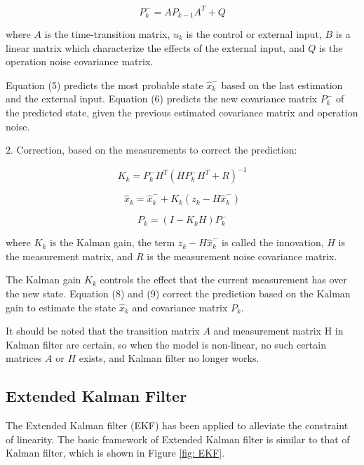 \documentclass[10pt,twocolumn,letterpaper]{article}
\begin{document}
\begin{equation}
P_k^-=AP_{k-1}A^T+Q
\end{equation}

where $A$ is the time-transition matrix,  $u_k$ is the control or external input, $B$ is a linear matrix which characterize the effects of the external input, and $Q$ is the operation noise covariance matrix.

Equation (5) predicts the most probable state $\hat{x}_k^-$ based on the last estimation and the external input. Equation (6) predicts the new covariance matrix $P_k^-$ of the predicted state, given the previous estimated covariance matrix and operation noise.

2. Correction, based on the measurements to correct the prediction:

\begin{equation}
K_k=P_k^-H^T(HP_k^-H^T+R)^{-1}
\end{equation}

\begin{equation}
\hat{x}_k=\hat{x}_k^-+K_k(z_k-H\hat{x}_k^-)
\end{equation}

\begin{equation}
P_k=(I-K_kH)P_k^-
\end{equation}

where $K_k$ is the Kalman gain, the term $z_k-H\hat{x}_k^-$ is called the innovation, $H$ is the measurement matrix, and $R$ is the measurement noise covariance matrix.

The Kalman gain $K_k$ controls the effect that the current measurement has over the new state. Equation (8) and (9) correct the prediction based on the Kalman gain to estimate the state $\hat{x}_k$ and covariance matrix $P_k$.

It should be noted that the transition matrix $A$ and measurement matrix H in Kalman filter are certain, so when the model is non-linear, no such certain matrices $A$ or $H$ exists, and Kalman filter no longer works.

\subsection{Extended Kalman Filter}

The Extended Kalman filter (EKF)\cite{ref:peter}\cite{ref:sorenson} has been applied to alleviate the constraint of linearity. The basic framework of Extended Kalman filter is similar to that of Kalman filter, which is shown in Figure \ref{fig: EKF}.
\end{document}
